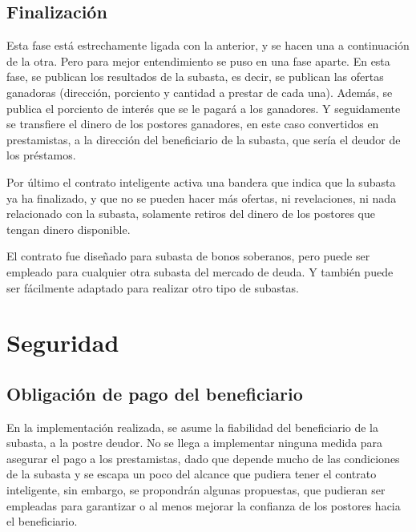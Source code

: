       \subsection{Finalización}
      Esta fase está estrechamente ligada con la anterior, y se hacen una a continuación de la otra. Pero para mejor entendimiento se 
      puso en una fase aparte. En esta fase, se publican los resultados de la subasta, es decir, se publican las ofertas ganadoras
      (dirección, porciento y cantidad a prestar de cada una). Además, se publica el porciento de interés que se le pagará a los ganadores.
      Y seguidamente se transfiere el dinero de los postores ganadores, en este caso convertidos en prestamistas, a la dirección del 
      beneficiario de la subasta, que sería el deudor de los préstamos.

      Por último el contrato inteligente activa una bandera que indica que la subasta ya ha finalizado, y que no se pueden hacer más
      ofertas, ni revelaciones, ni nada relacionado con la subasta, solamente retiros del dinero de los postores que tengan dinero disponible.

      El contrato fue diseñado para subasta de bonos soberanos, pero puede ser empleado para cualquier otra subasta del mercado de deuda.
      Y también puede ser fácilmente adaptado para realizar otro tipo de subastas.

  \section{Seguridad}
    \subsection{Obligación de pago del beneficiario}
      En la implementación realizada, se asume la fiabilidad del beneficiario de la subasta, a la postre deudor. No se llega a implementar
      ninguna medida para asegurar el pago a los prestamistas, dado que depende mucho de las condiciones de la subasta y se escapa un poco
      del alcance que pudiera tener el contrato inteligente, sin embargo, se 
      propondrán algunas propuestas, que pudieran ser empleadas para garantizar o al menos mejorar la confianza de los postores hacia
      el beneficiario.

